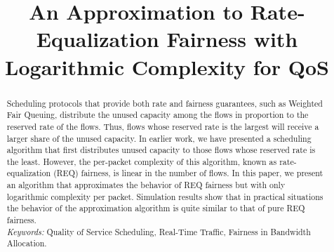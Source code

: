 \documentclass[conference]{IEEEtran}
\begin{document}
\title{An Approximation to Rate-Equalization Fairness with Logarithmic 
Complexity for QoS}
\author{
}

\maketitle

\begin{abstract}
Scheduling protocols that provide both rate and fairness guarantees, such as 
Weighted Fair Queuing, distribute the unused capacity among the flows in 
proportion to the reserved rate of the flows. Thus, flows whose reserved 
rate is the largest will receive a larger share of the unused capacity. In 
earlier work, we have presented a scheduling algorithm that first 
distributes unused capacity to those flows whose reserved rate is the least.  
However, the per-packet complexity of this algorithm, known as 
rate-equalization (REQ) fairness, is linear in the number of flows. In this 
paper, we present an algorithm that approximates the behavior of REQ 
fairness but with only logarithmic complexity per packet. Simulation results 
show that in practical situations the behavior of the approximation 
algorithm is quite similar to that of pure REQ fairness.
\smallskip\\
{\em Keywords:} Quality of Service Scheduling, Real-Time Traffic, Fairness in 
Bandwidth Allocation.
\end{abstract}


\newcommand{\femph}[1]{{#1}^{*}}



%
\end{document}
